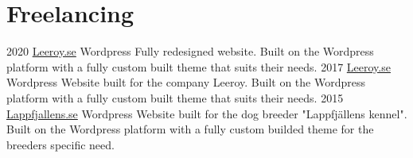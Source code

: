 \section{Freelancing}

\begin{entrylist}
    \entry
        {2020}
        {\href{https://leeroy.se}{Leeroy.se}}
        {Wordpress}
        {Fully redesigned website. Built on the Wordpress platform with a fully custom built theme that suits their needs.}
    \entry
        {2017}
        {\href{https://leeroy.se}{Leeroy.se}}
        {Wordpress}
        {Website built for the company Leeroy. Built on the Wordpress platform with a fully custom built theme that suits their needs.}
    \entry
        {2015}
        {\href{http://lappfjallens.se}{Lappfjallens.se}}
        {Wordpress}
        {Website built for the dog breeder "Lappfjällens kennel". Built on the Wordpress platform with a fully custom builded theme for the breeders specific need.}
\end{entrylist}
